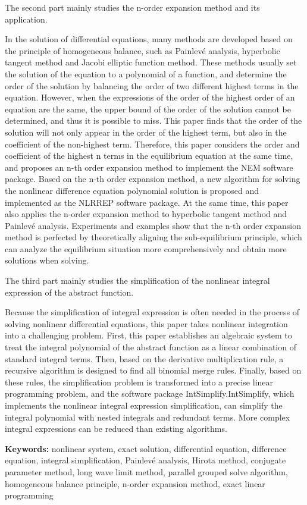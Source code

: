 The second part mainly studies the n-order expansion method and its application.

In the solution of differential equations, many methods are developed based on the principle of homogeneous balance, such as Painlevé analysis, hyperbolic tangent method and Jacobi elliptic function method. These methods usually set the solution of the equation to a polynomial of a function, and determine the order of the solution by balancing the order of two different highest terms in the equation. However, when the expressions of the order of the highest order of an equation are the same, the upper bound of the order of the solution cannot be determined, and thus it is possible to miss. This paper finds that the order of the solution will not only appear in the order of the highest term, but also in the coefficient of the non-highest term. Therefore, this paper considers the order and coefficient of the highest n terms in the equilibrium equation at the same time, and proposes an n-th order expansion method to implement the NEM software package. Based on the n-th order expansion method, a new algorithm for solving the nonlinear difference equation polynomial solution is proposed and implemented as the NLRREP software package. At the same time, this paper also applies the n-order expansion method to hyperbolic tangent method and Painlevé analysis. Experiments and examples show that the n-th order expansion method is perfected by theoretically aligning the sub-equilibrium principle, which can analyze the equilibrium situation more comprehensively and obtain more solutions when solving.

The third part mainly studies the simplification of the nonlinear integral expression of the abstract function.

Because the simplification of integral expression is often needed in the process of solving nonlinear differential equations, this paper takes nonlinear integration into a challenging problem. First, this paper establishes an algebraic system to treat the integral polynomial of the abstract function as a linear combination of standard integral terms. Then, based on the derivative multiplication rule, a recursive algorithm is designed to find all binomial merge rules. Finally, based on these rules, the simplification problem is transformed into a precise linear programming problem, and the software package IntSimplify.IntSimplify, which implements the nonlinear integral expression simplification, can simplify the integral polynomial with nested integrals and redundant terms. More complex integral expressions can be reduced than existing algorithms.

\bigskip
\noindent\textbf{ Keywords:}
nonlinear system, exact solution, differential equation, difference equation, integral simplification, Painlevé analysis, Hirota method, conjugate parameter method, long wave limit method, parallel grouped solve algorithm, homogeneous balance principle, n-order expansion method, exact linear programming
